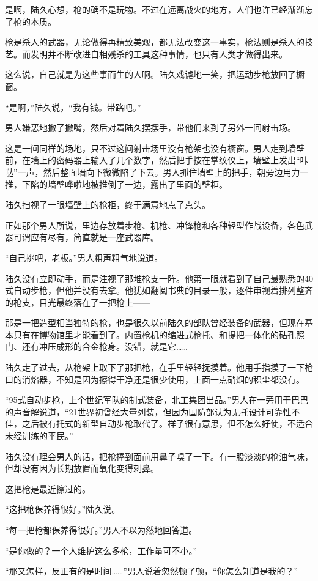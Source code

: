 是啊，陆久心想，枪的确不是玩物。不过在远离战火的地方，人们也许已经渐渐忘了枪的本质。

枪是杀人的武器，无论做得再精致美观，都无法改变这一事实，枪法则是杀人的技艺。而发明并不断改进自相残杀的工具这种事情，也只有人类才做得出来。

这么说，自己就是为这些事而生的人啊。陆久戏谑地一笑，把运动步枪放回了橱窗。

“是啊，”陆久说，“我有钱。带路吧。”

男人嫌恶地撇了撇嘴，然后对着陆久摆摆手，带他们来到了另外一间射击场。

这是一间同样的场地，只不过这间射击场里没有枪架也没有橱窗。男人走到墙壁前，在墙上的密码器上输入了几个数字，然后把手按在掌纹仪上，墙壁上发出“咔哒”一声，然后整面墙向下微微陷了下去。男人抓住墙壁上的把手，朝旁边用力一推，下陷的墙壁哗啦地被推倒了一边，露出了里面的壁柜。

陆久扫视了一眼墙壁上的枪柜，终于满意地点了点头。

正如那个男人所说，里边存放着步枪、机枪、冲锋枪和各种轻型作战设备，各色武器可谓应有尽有，简直就是一座武器库。

“自己挑吧，老板。”男人粗声粗气地说道。

陆久没有立即动手，而是注视了那堆枪支一阵。他第一眼就看到了自己最熟悉的40式自动步枪，但他并没有去拿。他犹如翻阅书典的目录一般，逐件审视着排列整齐的枪支，目光最终落在了一把枪上——

那是一把造型相当独特的枪，也是很久以前陆久的部队曾经装备的武器，但现在基本只有在博物馆里才能看到了。内置枪机的缩进式枪托、和提把一体化的砧孔照门、还有冲压成形的合金枪身。没错，就是它……

陆久走了过去，从枪架上取下了那把枪，在手里轻轻抚摸着。他用手指摸了一下枪口的消焰器，不知是因为擦得干净还是很少使用，上面一点硝烟的积尘都没有。

“95式自动步枪，上个世纪军队的制式装备，北工集团出品。”男人在一旁用干巴巴的声音解说道，“21世界初曾经大量列装，但因为国防部认为无托设计可靠性不佳，之后被有托式的新型自动步枪取代了。样子很有意思，但不怎么好使，不适合未经训练的平民。”

陆久没有理会男人的话，把枪捧到面前用鼻子嗅了一下。有一股淡淡的枪油气味，但却没有因为长期放置而氧化变得刺鼻。

这把枪是最近擦过的。

“这把枪保养得很好。”陆久说。

“每一把枪都保养得很好。”男人不以为然地回答道。

“是你做的？一个人维护这么多枪，工作量可不小。”

“那又怎样，反正有的是时间……”男人说着忽然顿了顿，“你怎么知道是我的？”

